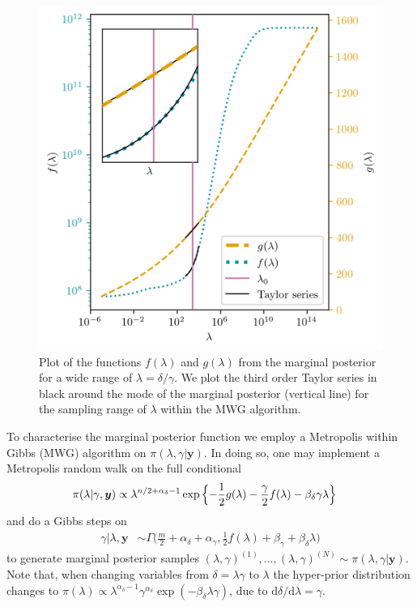 \begin{figure}[ht!]
	\centering
	\includegraphics{f_and_g_phd.png}
	\caption[Plot of the functions $f(\lambda)$ and $g(\lambda)$ for marginal posterior.]{Plot of the functions $f(\lambda)$ and $g(\lambda)$ from the marginal posterior for a wide range of $\lambda = \delta / \gamma$. We plot the third order Taylor series in black around the mode of the marginal posterior (vertical line) for the sampling range of $\lambda$ within the MWG algorithm.}
	\label{fig:fandg}
\end{figure}



To characterise the marginal posterior function we employ a Metropolis within Gibbs (MWG) algorithm on $\pi(\lambda, \gamma | \bm{y})$.
In doing so, one may implement a Metropolis random walk on the full conditional
\begin{align}
	\label{eq:lamCondPrior}
	\pi(\lambda | \gamma, \bm{y}) &\propto \lambda^{n/2+\alpha_\delta -1} \exp{\Bigl\{ - \frac{1}{2} g ( \lambda) - \frac{\gamma}{2} f ( \lambda) - \beta_\delta \gamma \lambda \Bigr\}} 
\end{align} 
and do a Gibbs steps on
\begin{align}
	\gamma |  \lambda, \bm{y} &\sim \Gamma \bigg( \frac{m}{2} + \alpha_\delta + \alpha_\gamma, \frac{1}{2} f (\lambda ) + \beta_\gamma + \beta_\delta \lambda \bigg)\label{eq:GibbsStep}
\end{align} 
to generate marginal posterior samples $(\lambda, \gamma)^{(1)}, \dots, (\lambda, \gamma)^{(N)} \sim  \pi(\lambda, \gamma| \bm{y})$.
Note that, when changing variables from $\delta = \lambda \gamma$ to $\lambda$ the hyper-prior distribution changes to $\pi(\lambda) \propto \lambda^{\alpha_\delta-1} \gamma^{\alpha_\delta} \exp{(- \beta_\delta \lambda  \gamma)} $, due to $\text{d}\delta / \text{d} \lambda = \gamma$.

